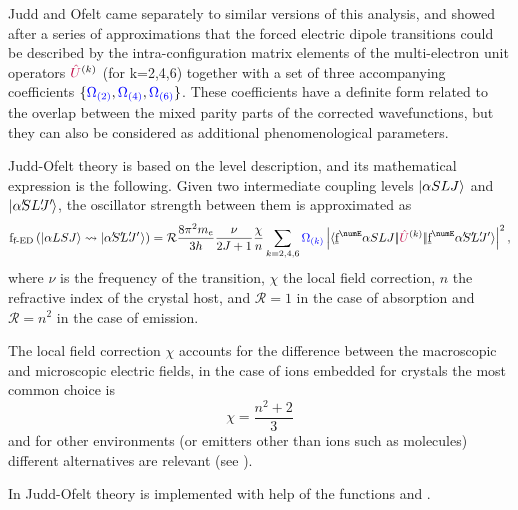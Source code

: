 \documentclass[11pt, twoside,openright]{article}
\begin{document}
Judd \cite{judd_optical_1962} and Ofelt \cite{ofelt_intensities_1962} came separately to similar versions of this analysis, and showed after a series of approximations that the forced electric dipole transitions could be described by the intra-configuration matrix elements of the multi-electron unit operators $\textcolor{purple}{\hat{U}}^{(k)}$ (for k=2,4,6) together with a set of three accompanying coefficients $\{\textcolor{blue}{\Omega_{(2)}},\textcolor{blue}{\Omega_{(4)}},\textcolor{blue}{\Omega_{(6)}}\}$. These coefficients have a definite form related to the overlap between the mixed parity parts of the corrected wavefunctions, but they can also be considered as additional phenomenological parameters.

Judd-Ofelt theory is based on the level description, and its mathematical expression is the following. Given two intermediate coupling levels $|\alpha SLJ\rangle$ and $\ket{\alpha\mathrlap{'} SL\mathrlap{'}J\mathrlap{'}\,}$, the oscillator strength between them is approximated as \cite{judd_optical_1962} 
\begin{equation}
\oStrength{f-ED}{\alpha{LSJ}}{\alpha\mathrlap{'} S\mathrlap{'} L\mathrlap{'} J\mathrlap{'}\,\,} = 
	\mathcal{R} \frac{8 \pi^2 m_e}{3 h}
	\frac{\nu}{\tpo{J}}
	\frac{\chi}{n} 
	\sum_{k=2,4,6}
		\JOk{k} 
		\left|
			\redbraopket{\forb^\numE \alpha SLJ}
				{\op{U}^{(k)}}
				{\forb^\numE \alpha\mathrlap{'} S\mathrlap{'} L\mathrlap{'} J'} 
		\right|^2,
\label{eqn:forced-dipole-judd-ofelt}
\end{equation}
where $\nu$ is the frequency of the transition, $\chi$ the local field correction, $n$ the refractive index of the crystal host, and $\mathcal{R} = 1$ in the case of absorption and $\mathcal{R} = n^2$ in the case of emission. 

The local field correction $\chi$ accounts for the difference between the macroscopic and microscopic electric fields, in the case of ions embedded for crystals the most common choice is 
\begin{equation}
	\chi = \frac{n^2+2}{3}  
\end{equation}
and for other environments (or emitters other than ions such as molecules) different alternatives are relevant (see \cite{duan_dependence_2006}).

In \qlanth Judd-Ofelt theory is implemented with help of the functions  and .

 

 
\end{document}
